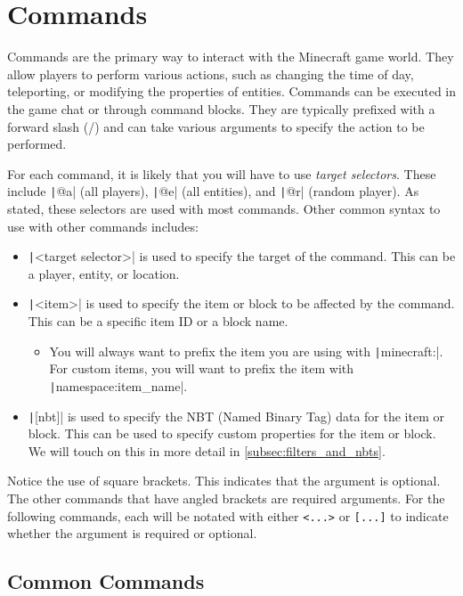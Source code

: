 \section{Commands}
\label{sec:commands}
Commands are the primary way to interact with the Minecraft game world. They allow players to perform various actions, such as changing the time of day, teleporting, or modifying the properties of entities. Commands can be executed in the game chat or through command blocks. They are typically prefixed with a forward slash (/) and can take various arguments to specify the action to be performed.

For each command, it is likely that you will have to use \textit{target selectors}. These include \texttt|@a| (all players), \texttt|@e| (all entities), and \texttt|@r| (random player). As stated, these selectors are used with most commands. Other common syntax to use with other commands includes:
\begin{itemize}
    \item \texttt|<target selector>| is used to specify the target of the command. This can be a player, entity, or location.
    \item \texttt|<item>| is used to specify the item or block to be affected by the command. This can be a specific item ID or a block name.
    \begin{itemize}
        \item You will always want to prefix the item you are using with \texttt|minecraft:|. For custom items, you will want to prefix the item with \texttt|namespace:item_name|.
    \end{itemize}
    \item \texttt|[nbt]| is used to specify the NBT (Named Binary Tag) data for the item or block. This can be used to specify custom properties for the item or block. We will touch on this in more detail in \autoref{subsec:filters_and_nbts}.
\end{itemize}
Notice the use of square brackets. This indicates that the argument is optional. The other commands that have angled brackets are required arguments. For the following commands, each will be notated with either \texttt{<...>} or \texttt{[...]} to indicate whether the argument is required or optional.

\subsection{Common Commands}
\label{subsec:common_commands}

